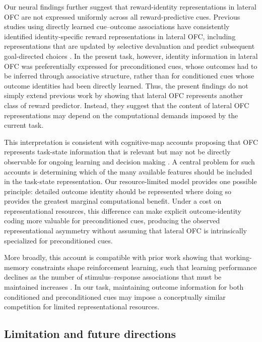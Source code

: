 \documentclass[12pt,letterpaper]{article}
\begin{document}
Our neural findings further suggest that reward-identity representations in lateral OFC are not expressed uniformly across all reward-predictive cues. Previous studies using directly learned cue--outcome associations have consistently identified identity-specific reward representations in lateral OFC, including representations that are updated by selective devaluation and predict subsequent goal-directed choices \cite{howard2015identity,howard2017identity,howard2018identity,liuyaoatt24,witkowski2026identity}. In the present task, however, identity information in lateral OFC was preferentially expressed for preconditioned cues, whose outcomes had to be inferred through associative structure, rather than for conditioned cues whose outcome identities had been directly learned. Thus, the present findings do not simply extend previous work by showing that lateral OFC represents another class of reward predictor. Instead, they suggest that the content of lateral OFC representations may depend on the computational demands imposed by the current task.

This interpretation is consistent with cognitive-map accounts proposing that OFC represents task-state information that is relevant but may not be directly observable for ongoing learning and decision making \cite{wilson2014orbitofrontal,schuck2016human,niv2019learning}. A central problem for such accounts is determining which of the many available features should be included in the task-state representation. Our resource-limited model provides one possible principle: detailed outcome identity should be represented where doing so provides the greatest marginal computational benefit. Under a cost on representational resources, this difference can make explicit outcome-identity coding more valuable for preconditioned cues, producing the observed representational asymmetry without assuming that lateral OFC is intrinsically specialized for preconditioned cues.

More broadly, this account is compatible with prior work showing that working-memory constraints shape reinforcement learning, such that learning performance declines as the number of stimulus–response associations that must be maintained increases \cite{collins2012much,collins2018tortoise}. In our task, maintaining outcome information for both conditioned and preconditioned cues may impose a conceptually similar competition for limited representational resources.


\subsection*{Limitation and future directions}
\end{document}
